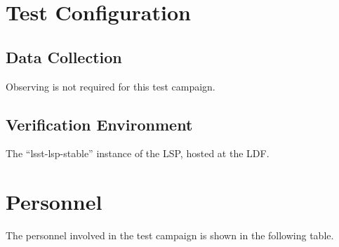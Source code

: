 \documentclass[DM,lsstdraft,STR,toc]{lsstdoc}
\begin{document}
\section{Test Configuration}
\label{sect:configuration}

\subsection{Data Collection}

  Observing is not required for this test campaign.

\subsection{Verification Environment}
\label{sect:hwconf}
  The ``lsst-lsp-stable'' instance of the LSP, hosted at the LDF.





\newpage
\section{Personnel}
\label{sect:personnel}

The personnel involved in the test campaign is shown in the following table.
\end{document}
